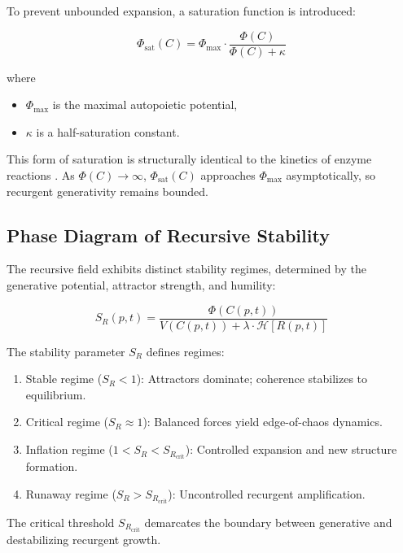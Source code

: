 To prevent unbounded expansion, a saturation function is introduced:

\begin{equation}
\Phi_{\text{sat}}(C) = \Phi_{\text{max}} \cdot \frac{\Phi(C)}{\Phi(C) + \kappa}
\end{equation}

where

\begin{itemize}
    \item \(\Phi_{\text{max}}\) is the maximal autopoietic potential,
    \item \(\kappa\) is a half-saturation constant.
\end{itemize}

This form of saturation is structurally identical to the kinetics of enzyme reactions \autocite{MichaelisMenten1913}. As \(\Phi(C) \to \infty\), \(\Phi_{\text{sat}}(C)\) approaches \(\Phi_{\text{max}}\) asymptotically, so recurgent generativity remains bounded.

\subsection{Phase Diagram of Recursive Stability}

The recursive field exhibits distinct stability regimes, determined by the generative potential, attractor strength, and humility:

\begin{equation}
S_R(p,t) = \frac{\Phi(C(p,t))}{V(C(p,t)) + \lambda \cdot \mathcal{H}[R(p,t)]}
\end{equation}

The stability parameter \(S_R\) defines regimes:

\begin{enumerate}
    \item Stable regime (\(S_R < 1\)): Attractors dominate; coherence stabilizes to equilibrium.
    \item Critical regime (\(S_R \approx 1\)): Balanced forces yield edge-of-chaos dynamics.
    \item Inflation regime (\(1 < S_R < S_{R_{\text{crit}}}\)): Controlled expansion and new structure formation.
    \item Runaway regime (\(S_R > S_{R_{\text{crit}}}\)): Uncontrolled recurgent amplification.
\end{enumerate}

The critical threshold \(S_{R_{\text{crit}}}\) demarcates the boundary between generative and destabilizing recurgent growth.

